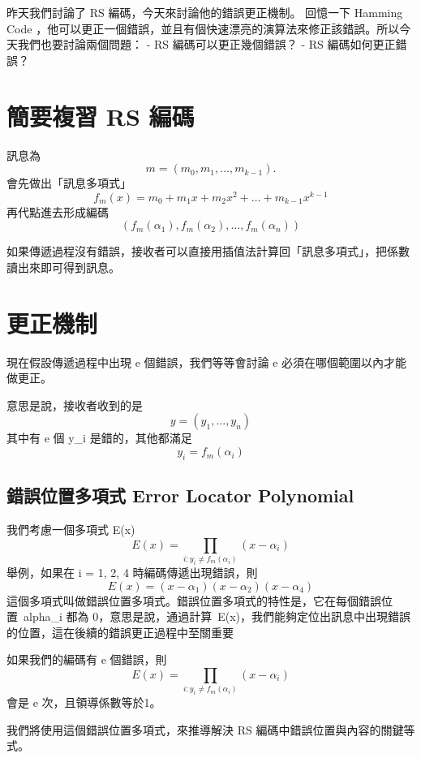 \documentclass[
]{article}
\author{}
\date{}
\begin{document}
昨天我們討論了 RS 編碼，今天來討論他的錯誤更正機制。 回憶一下 Hamming
Code
，他可以更正一個錯誤，並且有個快速漂亮的演算法來修正該錯誤。所以今天我們也要討論兩個問題：
- RS 編碼可以更正幾個錯誤？ - RS 編碼如何更正錯誤？

\hypertarget{ux7c21ux8981ux8907ux7fd2-rs-ux7de8ux78bc}{%
\section{簡要複習 RS
編碼}\label{ux7c21ux8981ux8907ux7fd2-rs-ux7de8ux78bc}}

訊息為 \[
m = (m_{0},m_{1},\dots,m_{k-1}).
\] 會先做出「訊息多項式」 \[
f_{m}(x) = m_{0}+m_{1}x+m_{2}x^{2}+\dots+m_{k-1}x^{k-1}
\] 再代點進去形成編碼 \[
(f_{m}(\alpha_{1}),f_{m}(\alpha_{2}),\dots,f_{m}(\alpha_{n}))
\]

如果傳遞過程沒有錯誤，接收者可以直接用插值法計算回「訊息多項式」，把係數讀出來即可得到訊息。

\hypertarget{ux66f4ux6b63ux6a5fux5236}{%
\section{更正機制}\label{ux66f4ux6b63ux6a5fux5236}}

現在假設傳遞過程中出現 e 個錯誤，我們等等會討論 e
必須在哪個範圍以內才能做更正。

意思是說，接收者收到的是 \[
y = (y_{1},\dots,y_{n})
\] 其中有 e 個 y\_i 是錯的，其他都滿足 \[
y_{i} = f_{m}(\alpha_{i})
\]

\hypertarget{ux932fux8aa4ux4f4dux7f6eux591aux9805ux5f0f-error-locator-polynomial}{%
\subsection{錯誤位置多項式 Error Locator
Polynomial}\label{ux932fux8aa4ux4f4dux7f6eux591aux9805ux5f0f-error-locator-polynomial}}

我們考慮一個多項式 E(x) \[
E(x) = \prod_{i: y_{i}\neq f_{m}(\alpha_{i})} (x-\alpha_{i})
\] 舉例，如果在 i = 1, 2, 4 時編碼傳遞出現錯誤，則 \[
E(x) = (x-\alpha_{1})(x-\alpha_{2})(x-\alpha_{4})
\]
這個多項式叫做錯誤位置多項式。錯誤位置多項式的特性是，它在每個錯誤位置~alpha\_i
都為
0，意思是說，通過計算~E(x)，我們能夠定位出訊息中出現錯誤的位置，這在後續的錯誤更正過程中至關重要

如果我們的編碼有 e 個錯誤，則 \[
E(x) = \prod_{i: y_{i}\neq f_{m}(\alpha_{i})} (x-\alpha_{i})
\] 會是 e 次，且領導係數等於1。

我們將使用這個錯誤位置多項式，來推導解決 RS
編碼中錯誤位置與內容的關鍵等式。
\end{document}
